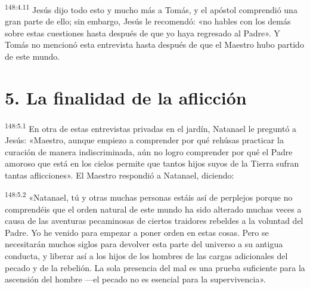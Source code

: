 \par
\textsuperscript{148:4.11} Jesús dijo todo esto y mucho más a Tomás, y el apóstol comprendió una gran parte de ello; sin embargo, Jesús le recomendó: «no hables con los demás sobre estas cuestiones hasta después de que yo haya regresado al Padre». Y Tomás no mencionó esta entrevista hasta después de que el Maestro hubo partido de este mundo.

\section*{5. La finalidad de la aflicción}
\par
\textsuperscript{148:5.1} En otra de estas entrevistas privadas en el jardín, Natanael le preguntó a Jesús: «Maestro, aunque empiezo a comprender por qué rehúsas practicar la curación de manera indiscriminada, aún no logro comprender por qué el Padre amoroso que está en los cielos permite que tantos hijos suyos de la Tierra sufran tantas aflicciones». El Maestro respondió a Natanael, diciendo:

\par
\textsuperscript{148:5.2} «Natanael, tú y otras muchas personas estáis así de perplejos porque no comprendéis que el orden natural de este mundo ha sido alterado muchas veces a causa de las aventuras pecaminosas de ciertos traidores rebeldes a la voluntad del Padre. Yo he venido para empezar a poner orden en estas cosas. Pero se necesitarán muchos siglos para devolver esta parte del universo a su antigua conducta, y liberar así a los hijos de los hombres de las cargas adicionales del pecado y de la rebelión. La sola presencia del mal es una prueba suficiente para la ascensión del hombre ---el pecado no es esencial para la supervivencia».

